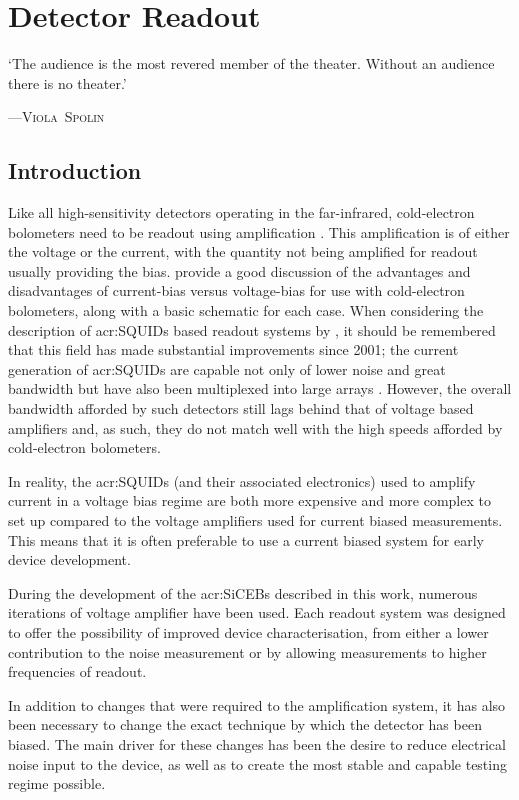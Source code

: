\chapter{Detector Readout}
\label{cha:readout}

\epigraph{`The audience is the most revered member of the theater. Without an audience there is no theater.'}{\mbox{\textup{---\textsc{Viola Spolin}}}}

\section{Introduction}
\label{sec:readout-introduction}

Like all high-sensitivity detectors operating in the far-infrared, cold-electron bolometers need to be readout using amplification \parencite{Rieke2007}. This amplification is of either the voltage or the current, with the quantity not being amplified for readout usually providing the bias. \textcite{Golubev2001} provide a good discussion of the advantages and disadvantages of current-bias versus voltage-bias for use with cold-electron bolometers, along with a basic schematic for each case. When considering the description of \glspl{acr:SQUID} based readout systems by \textcite{Golubev2001}, it should be remembered that this field has made substantial improvements since 2001; the current generation of \glspl{acr:SQUID} are capable not only of lower noise and great bandwidth \parencite[see, for example,][]{Granata2015} but have also been multiplexed into large arrays \parencite[see, for example,][]{Irwin2002}. However, the overall bandwidth afforded by such detectors still lags behind that of voltage based amplifiers and, as such, they do not match well with the high speeds afforded by cold-electron bolometers. 
\par 
In reality, the \glspl{acr:SQUID} (and their associated electronics) used to amplify current in a voltage bias regime are both more expensive and more complex to set up compared to the voltage amplifiers used for current biased measurements. This means that it is often preferable to use a current biased system for early device development.
\par 
During the development of the \glspl{acr:SiCEB} described in this work, numerous iterations of voltage amplifier have been used. Each readout system was designed to offer the possibility of improved device characterisation, from either a lower contribution to the noise measurement or by allowing measurements to higher frequencies of readout.
\par
In addition to changes that were required to the amplification system, it has also been necessary to change the exact technique by which the detector has been biased. The main driver for these changes has been the desire to reduce electrical noise input to the device, as well as to create the most stable and capable testing regime possible.

